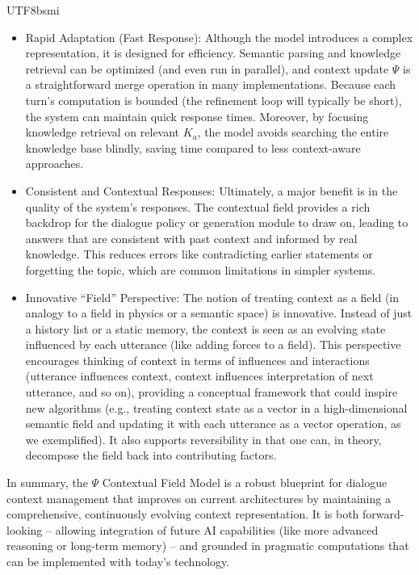 \documentclass{article}
\begin{document}
\begin{CJK*}{UTF8}{bsmi}
\begin{itemize}[label=●]
    \item Rapid Adaptation (Fast Response): Although the model introduces a complex representation, it is designed for efficiency. Semantic parsing and knowledge retrieval can be optimized (and even run in parallel), and context update $\Psi$ is a straightforward merge operation in many implementations. Because each turn’s computation is bounded (the refinement loop will typically be short), the system can maintain quick response times. Moreover, by focusing knowledge retrieval on relevant $K_a$, the model avoids searching the entire knowledge base blindly, saving time compared to less context-aware approaches.
    \item Consistent and Contextual Responses: Ultimately, a major benefit is in the quality of the system’s responses. The contextual field provides a rich backdrop for the dialogue policy or generation module to draw on, leading to answers that are consistent with past context and informed by real knowledge. This reduces errors like contradicting earlier statements or forgetting the topic, which are common limitations in simpler systems.
    \item Innovative “Field” Perspective: The notion of treating context as a field (in analogy to a field in physics or a semantic space) is innovative. Instead of just a history list or a static memory, the context is seen as an evolving state influenced by each utterance (like adding forces to a field). This perspective encourages thinking of context in terms of influences and interactions (utterance influences context, context influences interpretation of next utterance, and so on), providing a conceptual framework that could inspire new algorithms (e.g., treating context state as a vector in a high-dimensional semantic field and updating it with each utterance as a vector operation, as we exemplified). It also supports reversibility in that one can, in theory, decompose the field back into contributing factors.
\end{itemize}

In summary, the $\Psi$ Contextual Field Model is a robust blueprint for dialogue context management that improves on current architectures by maintaining a comprehensive, continuously evolving context representation. It is both forward-looking – allowing integration of future AI capabilities (like more advanced reasoning or long-term memory) – and grounded in pragmatic computations that can be implemented with today’s technology.


\end{CJK*}
\end{document}
